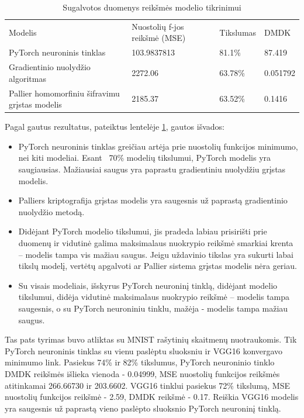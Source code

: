 \documentclass{VUMIFInfBakalaurinis}
\begin{document}
\begin{table}[h]
\begin{adjustbox}{width=\textwidth,center=\textwidth}
\begin{tabular}{|l|l|l|l|}
\cline{1-4}
Modelis & Nuostolių f-jos reikšmė (MSE) & Tikslumas & DMDK  \\\cline{1-4}
PyTorch neuroninis tinklas & 103.9837813 & 81.1\% & 87.419  \\\cline{1-4}
Gradientinio nuolydžio algoritmas & 2272.06 & 63.78\% & 0.051792 \\\cline{1-4}
Pallier homomorfiniu šifravimu grįstas modelis & 2185.37 & 63.52\% & 0.1416 \\\cline{1-4}
\end{tabular}
\end{adjustbox}
\caption{Sugalvotos duomenys reikšmės modelio tikrinimui}
\label{tab:DMDK rezultatai}
\end{table}

\par Pagal gautus rezultatus, pateiktus lentelėje \ref{tab:DMDK rezultatai}, gautos išvados:
\begin{itemize}
    \item PyTorch neuroninis tinklas greičiau artėja prie nuostolių funkcijos minimumo, nei kiti modeliai. Esant ~70\% modelių tikslumui, PyTorch modelis yra saugiausias. Mažiausiai saugus yra paprastu gradientiniu nuolydžiu grįstas modelis. 
    \item Palliers kriptografija grįstas modelis yra saugesnis už paprastą gradientinio nuolydžio metodą.
    \item Didėjant PyTorch modelio tikslumui, jis pradeda labiau prisirišti prie duomenų ir vidutinė galima maksimalaus nuokrypio reikšmė smarkiai krenta – modelis tampa vis mažiau saugus. Jeigu uždavinio tikslas yra sukurti labai tikslų modelį, vertėtų apgalvoti ar Pallier sistema grįstas modelis nėra geriau.
    \item Su visais modeliais, išskyrus PyTorch neuroninį tinklą, didėjant modelio tikslumui, didėja vidutinė maksimalaus nuokrypio reikšmė – modelis tampa saugesnis, o su PyTorch neuroniniu tinklu, mažėja - modelis tampa mažiau saugus. 
\end{itemize}

\par Tas pats tyrimas buvo atliktas su MNIST rašytinių skaitmenų nuotraukomis. Tik PyTorch neuroninis tinklas su vienu paslėptu sluoksniu ir VGG16 konvergavo minimumo link. Pasiekus 74\% ir 82\% tikslumus, PyTorch neuroninio tinklo DMDK reikšmės išlieka vienoda - 0.04999, MSE nuostolių funkcijos reikšmės atitinkamai 266.66730 ir 203.6602. VGG16 tinklui pasiekus 72\% tikslumą, MSE nuostolių funkcijos reikšmė - 2.59, DMDK reikšmė -  0.17. Reiškia VGG16 modelis yra saugesnis už paprastą vieno paslėpto sluoksnio PyTorch neuroninį tinklą.
\end{document}
